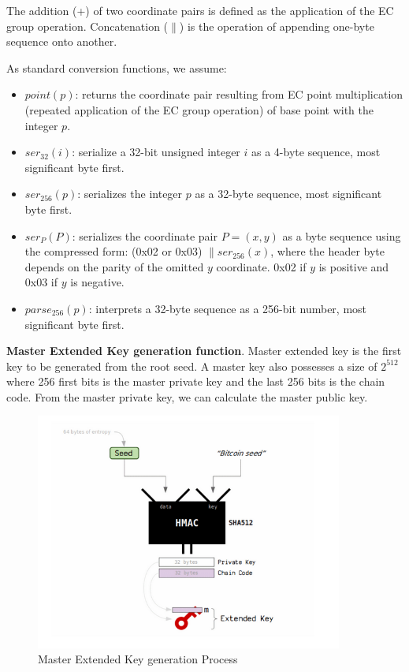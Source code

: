 The addition (+) of two coordinate pairs is defined as the application of the EC group operation. Concatenation ($\parallel$) is the operation of appending one-byte sequence onto another.

As standard conversion functions, we assume:

\begin{itemize}
    \item $point(p)$: returns the coordinate pair resulting from EC point multiplication (repeated application of the EC group operation) of base point with the integer $p$.

    \item $ser_{32}(i)$: serialize a 32-bit unsigned integer $i$ as a 4-byte sequence, most significant byte first.

    \item $ser_{256}(p)$: serializes the integer $p$ as a 32-byte sequence, most significant byte first.
    \item $ser_P(P)$: serializes the coordinate pair $P = (x,y)$ as a byte sequence using the compressed form: (0x02 or 0x03) $\parallel ser_{256}(x)$, where the header byte depends on the parity of the omitted $y$ coordinate. 0x02 if $y$ is positive and 0x03 if $y$ is negative.
    \item $parse_{256}(p)$: interprets a 32-byte sequence as a 256-bit number, most significant byte first.
\end{itemize}


\bigskip
{\textbf{Master Extended Key generation function}}. Master extended key is the first key to be generated from the root seed. A master key also possesses a size of $2^{512}$ where 256 first bits is the master private key and the last 256 bits is the chain code. From the master private key, we can calculate the master public key.

\begin{figure}[ht!]
    \centering
    \includegraphics[width=0.9\textwidth]{images/masterbip32.png}
    \caption[Master Extended Key generation Process]{Master Extended Key generation Process \cite{learnme}}
    \label{fig:master_bip32}
\end{figure}

